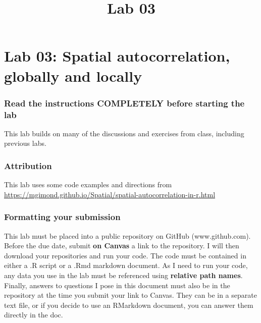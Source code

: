 \documentclass[]{article}
\title{Lab 03}
\author{}
\date{}
\makeatletter
\renewcommand{\maketitle}{\bgroup\vspace*{-1cm}\setlength{\parindent}{0pt}
\begin{flushleft}
  \@author
  
  \@date
  
\end{flushleft}\egroup
}
\makeatother
\begin{document}
\maketitle

\hypertarget{lab-03-spatial-autocorrelation-globally-and-locally}{%
\section{Lab 03: Spatial autocorrelation, globally and
locally}\label{lab-03-spatial-autocorrelation-globally-and-locally}}

\hypertarget{read-the-instructions-completely-before-starting-the-lab}{%
\subsubsection{Read the instructions COMPLETELY before starting the
lab}\label{read-the-instructions-completely-before-starting-the-lab}}

This lab builds on many of the discussions and exercises from class,
including previous labs.

\hypertarget{attribution}{%
\subsubsection{Attribution}\label{attribution}}

This lab uses some code examples and directions from
\url{https://mgimond.github.io/Spatial/spatial-autocorrelation-in-r.html}

\hypertarget{formatting-your-submission}{%
\subsubsection{Formatting your
submission}\label{formatting-your-submission}}

This lab must be placed into a public repository on GitHub
(www.github.com). Before the due date, submit \textbf{on Canvas} a link
to the repository. I will then download your repositories and run your
code. The code must be contained in either a .R script or a .Rmd
markdown document. As I need to run your code, any data you use in the
lab must be referenced using \textbf{relative path names}. Finally,
answers to questions I pose in this document must also be in the
repository at the time you submit your link to Canvas. They can be in a
separate text file, or if you decide to use an RMarkdown document, you
can answer them directly in the doc.
\end{document}
